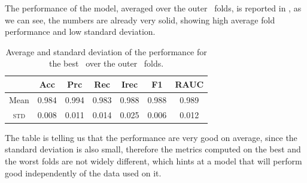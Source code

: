 The performance of the model, averaged over the outer \cv\ folds, is reported in ,
as we can see, the numbers are already very solid, showing high average fold performance and low
standard deviation.
\begin{table}[!ht]
	\caption{Average and standard deviation of the performance for the best \dt\ over the outer \cv\
		folds.}\label{tbl:an-2-12-perf}

	\bigskip
	\setlength{\tabcolsep}{6pt}
	\centering
	\begin{tabular}{ccccccc}
		\toprule
		\textbf{}    & \textbf{Acc} & \textbf{Prc} & \textbf{Rec} & \textbf{Irec} & \textbf{F1} & \textbf{RAUC} \\
		\midrule
		Mean         & 0.984        & 0.994        & 0.983        & 0.988         & 0.988
		             & 0.989                                                                                    \\
		\textsc{std} & 0.008        & 0.011        & 0.014        & 0.025         & 0.006
		             & 0.012                                                                                    \\
		\bottomrule
	\end{tabular}
\end{table}
The table is telling us that the performance are very good on average, since the standard deviation
is also small, therefore the metrics computed on the best and the worst folds are not widely
different, which hints at a model that will perform good independently of the data used on it.

